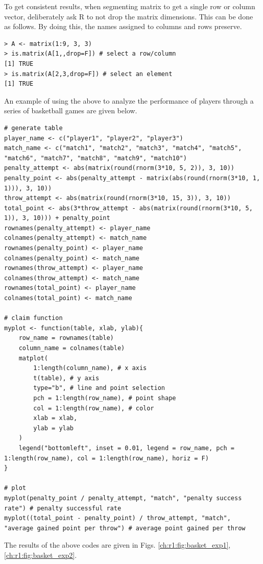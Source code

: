To get consistent results, when segmenting matrix to get a single row or column vector, deliberately ask R to not drop the matrix dimensions. This can be done as follows. By doing this, the names assigned to columns and rows preserve.
\begin{lstlisting}
> A <- matrix(1:9, 3, 3)
> is.matrix(A[1,,drop=F]) # select a row/column
[1] TRUE
> is.matrix(A[2,3,drop=F]) # select an element
[1] TRUE
\end{lstlisting}

An example of using the above to analyze the performance of players through a series of basketball games are given below.
\begin{lstlisting}
# generate table
player_name <- c("player1", "player2", "player3")
match_name <- c("match1", "match2", "match3", "match4", "match5", "match6", "match7", "match8", "match9", "match10")
penalty_attempt <- abs(matrix(round(rnorm(3*10, 5, 2)), 3, 10))
penalty_point <- abs(penalty_attempt - matrix(abs(round(rnorm(3*10, 1, 1))), 3, 10))
throw_attempt <- abs(matrix(round(rnorm(3*10, 15, 3)), 3, 10))
total_point <- abs(3*throw_attempt - abs(matrix(round(rnorm(3*10, 5, 1)), 3, 10))) + penalty_point
rownames(penalty_attempt) <- player_name
colnames(penalty_attempt) <- match_name
rownames(penalty_point) <- player_name
colnames(penalty_point) <- match_name
rownames(throw_attempt) <- player_name
colnames(throw_attempt) <- match_name
rownames(total_point) <- player_name
colnames(total_point) <- match_name

# claim function
myplot <- function(table, xlab, ylab){
    row_name = rownames(table)
    column_name = colnames(table)
    matplot(
    	1:length(column_name), # x axis
    	t(table), # y axis
    	type="b", # line and point selection
    	pch = 1:length(row_name), # point shape
    	col = 1:length(row_name), # color
    	xlab = xlab,
    	ylab = ylab
    )
    legend("bottomleft", inset = 0.01, legend = row_name, pch = 1:length(row_name), col = 1:length(row_name), horiz = F)
}

# plot
myplot(penalty_point / penalty_attempt, "match", "penalty success rate") # penalty successful rate
myplot((total_point - penalty_point) / throw_attempt, "match", "average gained point per throw") # average point gained per throw
\end{lstlisting}

The results of the above codes are given in Figs. \ref{ch:r1:fig:basket_exp1}, \ref{ch:r1:fig:basket_exp2}.

